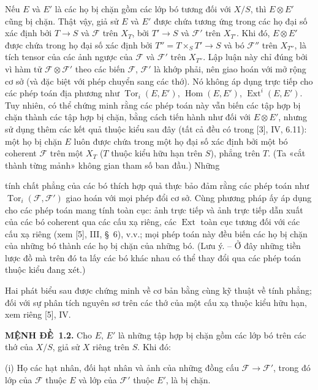 \documentclass[11pt,twoside,openany]{book}
\numberwithin{equation}{section}
\newcommand{\src}[1]{%
  \phantomsection\hypertarget{src:\fgasourceid:#1}{}%
  \marginpar{\raggedleft\footnotesize\sffamily #1}%
}
\newcommand{\fgasourceid}{unset}
\newcommand{\result}[2]{\par\medskip\noindent\textbf{#1\if\relax\detokenize{#2}\relax\else\ #2\fi.}\quad}
\begin{document}
Nếu $E$ và $E'$ là các họ bị chặn gồm các lớp bó tương đối với $X/S$, thì
$E\otimes E'$ cũng bị chặn. Thật vậy, giả sử $E$ và $E'$ được chứa tương ứng
trong các họ đại số xác định bởi $T\longrightarrow S$ và $\mathcal F$ trên
$X_T$, bởi $T'\longrightarrow S$ và $\mathcal F'$ trên $X_{T'}$. Khi đó,
$E\otimes E'$ được chứa trong họ đại số xác định bởi
$T''=T\times_S T'\longrightarrow S$ và bó $\mathcal F''$ trên $X_{T''}$, là
tích tensor của các ảnh ngược của $\mathcal F$ và $\mathcal F'$ trên
$X_{T''}$. Lập luận này chỉ đúng bởi vì hàm tử
$\mathcal F\otimes\mathcal F'$ theo các biến $\mathcal F$, $\mathcal F'$ là
khớp phải, nên giao hoán với mở rộng cơ sở (và đặc biệt với phép chuyển sang
các thớ). Nó không áp dụng trực tiếp cho các phép toán địa phương như
$\operatorname{Tor}_i(E,E')$, $\operatorname{Hom}(E,E')$,
$\operatorname{Ext}^i(E,E')$. Tuy nhiên, có thể chứng minh rằng các phép toán
này vẫn biến các tập hợp bị chặn thành các tập hợp bị chặn, bằng cách tiến hành
như đối với $E\otimes E'$, nhưng sử dụng thêm các kết quả thuộc kiểu sau đây
(tất cả đều có trong [3], IV, 6.11): một họ bị chặn $E$ luôn được chứa trong
một họ đại số xác định bởi một bó coherent $\mathcal F$ trên một $X_T$ ($T$
thuộc kiểu hữu hạn trên $S$), phẳng trên $T$. (Ta «cắt thành từng mảnh» không
gian tham số ban đầu.) Những
\src{252}
tính chất phẳng của các bó thích hợp quả thực bảo đảm rằng các phép toán như
$\operatorname{Tor}_i(\mathcal F,\mathcal F')$ giao hoán với mọi phép đổi cơ
sở. Cùng phương pháp ấy áp dụng cho các phép toán mang tính toàn cục: ảnh trực
tiếp và ảnh trực tiếp dẫn xuất của các bó coherent qua các cấu xạ riêng, các
$\operatorname{Ext}$ toàn cục tương đối với các cấu xạ riêng (xem [5], III,
\S~6), v.v.; mọi phép toán này đều biến các họ bị chặn của những bó thành các
họ bị chặn của những bó. (Lưu ý. -- Ở đây những tiền lược đồ mà trên đó ta lấy
các bó khác nhau có thể thay đổi qua các phép toán thuộc kiểu đang xét.)

Hai phát biểu sau được chứng minh về cơ bản bằng cùng kỹ thuật về tính phẳng;
đối với sự phân tích nguyên sơ trên các thớ của một cấu xạ thuộc kiểu hữu hạn,
xem riêng [5], IV.

\result{MỆNH ĐỀ}{1.2} Cho $E$, $E'$ là những tập hợp bị chặn gồm các lớp bó
trên các thớ của $X/S$, giả sử $X$ riêng trên $S$. Khi đó:

\medskip
\noindent (i) Họ các hạt nhân, đối hạt nhân và ảnh của những đồng cấu
$\mathcal F\longrightarrow\mathcal F'$, trong đó lớp của $\mathcal F$ thuộc
$E$ và lớp của $\mathcal F'$ thuộc $E'$, là bị chặn.
\end{document}
